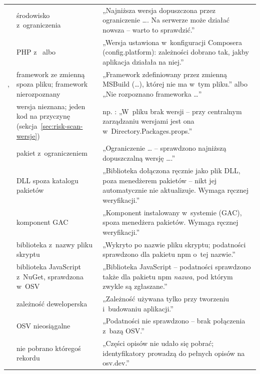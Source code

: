 \begin{xltabular}{\linewidth}{@{}>{\raggedright\arraybackslash}p{3.9cm} >{\raggedright\arraybackslash}p{3.9cm} >{\raggedright\arraybackslash}X@{}}
 & środowisko z~ograniczenia & „Najniższa wersja dopuszczona przez ograniczenie …. Na serwerze może działać nowsza -- warto to sprawdzić.” \\
 & PHP z~ albo  & „Wersja ustawiona w~konfiguracji Composera (config.platform): zależności dobrano tak, jakby aplikacja działała na niej.” \\
,  & framework ze zmienną spoza pliku; framework nierozpoznany & „Framework zdefiniowany przez zmienną MSBuild (…), której nie ma w~tym pliku.” albo „Nie rozpoznano frameworka …” \\
 & wersja nieznana; jeden kod na przyczynę (sekcja~\ref{sec:risk-scan-wersje}) & np. : „W~pliku brak wersji -- przy centralnym zarządzaniu wersjami jest ona w~Directory.Packages.props.” \\
 & pakiet z~ograniczeniem & „Ograniczenie … -- sprawdzono najniższą dopuszczalną wersję ….” \\
 & DLL spoza katalogu pakietów & „Biblioteka dołączona ręcznie jako plik DLL, poza menedżerem pakietów -- nikt jej automatycznie nie aktualizuje. Wymaga ręcznej weryfikacji.” \\
 & komponent GAC & „Komponent instalowany w~systemie (GAC), spoza menedżera pakietów. Wymaga ręcznej weryfikacji.” \\
 & biblioteka z~nazwy pliku skryptu & „Wykryto po nazwie pliku skryptu; podatności sprawdzono dla pakietu npm o~tej nazwie.” \\
 & biblioteka JavaScript z~NuGet, sprawdzona w~OSV & „Biblioteka JavaScript -- podatności sprawdzono także dla pakietu npm \emph{nazwa}, pod którym zwykle są zgłaszane.” \\
 & zależność deweloperska & „Zależność używana tylko przy tworzeniu i~budowaniu aplikacji.” \\
 & OSV nieosiągalne & „Podatności nie sprawdzono -- brak połączenia z~bazą OSV.” \\
 & nie pobrano któregoś rekordu & „Części opisów nie udało się pobrać; identyfikatory prowadzą do pełnych opisów na osv.dev.” \\
\bottomrule
\end{xltabular}

